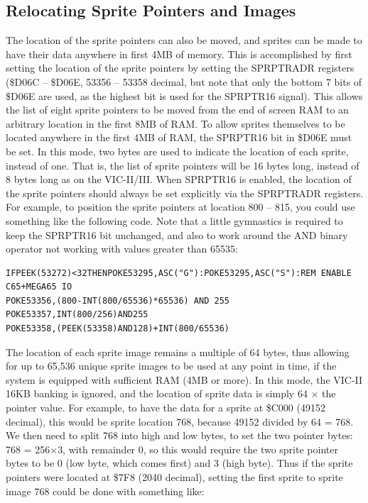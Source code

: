 \subsection{Relocating Sprite Pointers and Images}

The location of the sprite pointers can also be moved, and sprites can be made to have their data anywhere in first 4MB of memory.
This is accomplished by first setting the location of the sprite pointers by setting the SPRPTRADR registers (\$D06C -- \$D06E, 53356 -- 53358 decimal, but note that only the bottom 7 bits of \$D06E are used, as the highest bit is used for the SPRPTR16 signal).  This allows the list of
eight sprite pointers to be moved from the end of screen RAM to an arbitrary location in the first 8MB of RAM.  To allow sprites themselves
to be located anywhere in the first 4MB of RAM, the SPRPTR16 bit in \$D06E must be set. In this mode, two bytes are used to indicate the
location of each sprite, instead of one. That is, the list of sprite pointers will be 16 bytes long, instead of 8 bytes long as on the VIC-II/III.  When SPRPTR16 is enabled, the location of the sprite pointers should always be set explicitly via the SPRPTRADR registers.
For example, to position the sprite pointers at location 800 -- 815, you could use something like the following code. Note that a little gymnastics is required to keep the SPRPTR16 bit unchanged, and also to work around the AND binary operator not working with values greater than 65535:

\begin{tcolorbox}[colback=black,coltext=white]
\verbatimfont{\codefont}
\begin{verbatim}
IFPEEK(53272)<32THENPOKE53295,ASC("G"):POKE53295,ASC("S"):REM ENABLE C65+MEGA65 IO
POKE53356,(800-INT(800/65536)*65536) AND 255
POKE53357,INT(800/256)AND255
POKE53358,(PEEK(53358)AND128)+INT(800/65536)
\end{verbatim}
\end{tcolorbox}

The location of each sprite image remains a multiple of 64 bytes, thus allowing for up to 65,536 unique sprite images
to be used at any point in time, if the system is equipped with sufficient RAM (4MB or more).  In this mode, the VIC-II 16KB banking is ignored, and the location of sprite data is simply 64 $\times$ the pointer value.  For example, to have the data for a sprite at \$C000 (49152 decimal), this would be sprite location 768, because 49152 divided by 64 = 768.  We then need to split 768 into high and low bytes, to set the two pointer bytes: 768 = 256$\times$3, with remainder 0, so this would require the two sprite pointer bytes to be 0 (low byte, which comes first) and 3 (high byte).  Thus if the sprite pointers were located at \$7F8 (2040 decimal), setting the first sprite to sprite image 768 could be done with something like:

